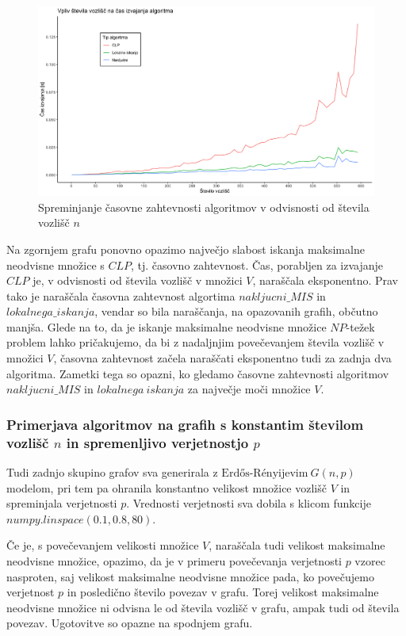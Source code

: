 \documentclass[a4paper, 12pt]{article}
\begin{document}
\begin{figure}[h!]
	\begin{center}
		\includegraphics[scale=0.10]{R_koda/voz-cas.png}
		\caption{Spreminjanje časovne zahtevnosti algoritmov v odvisnosti od števila vozlišč $n$}
	\end{center}
\end{figure}

Na zgornjem grafu ponovno opazimo največjo slabost iskanja maksimalne neodvisne množice s $CLP$, tj. časovno zahtevnost. Čas, porabljen za izvajanje $CLP$ je, v odvisnosti od števila vozlišč v množici $V$,
naraščala eksponentno. Prav tako je naraščala časovna zahtevnost algortima $nakljucni\_MIS$ in $lokalnega\_iskanja$, vendar so bila naraščanja, na opazovanih grafih, občutno manjša.
Glede na to, da je iskanje maksimalne neodvisne množice $NP$-težek problem lahko pričakujemo, da bi z nadaljnjim povečevanjem števila vozlišč v množici $V$, časovna zahtevnost začela naraščati
eksponentno tudi za zadnja dva algoritma. Zametki tega so opazni, ko gledamo časovne zahtevnosti algoritmov $nakljucni\_MIS$ in $lokalnega\ iskanja$ za največje moči množice $V$.

\subsubsection{Primerjava algoritmov na grafih s konstantim številom vozlišč $n$ in spremenljivo verjetnostjo $p$}

Tudi zadnjo skupino grafov sva generirala z $\text{Erdős-Rényijevim}\ G(n, p)$ modelom, pri tem pa ohranila konstantno velikost množice vozlišč $V$ in spreminjala verjetnosti $p$.
Vrednosti verjetnosti sva dobila s klicom funkcije $numpy.linspace(0.1, 0.8, 80)$.

Če je, s povečevanjem velikosti množice $V$, naraščala tudi velikost maksimalne neodvisne množice, opazimo, da je v primeru povečevanja verjetnosti $p$ vzorec nasproten, saj
velikost maksimalne neodvisne množice pada, ko povečujemo verjetnost $p$ in posledično število povezav v grafu. Torej velikost maksimalne neodvisne množice ni odvisna le od števila vozlišč v grafu,
ampak tudi od števila povezav. Ugotovitve so opazne na spodnjem grafu.
\end{document}
